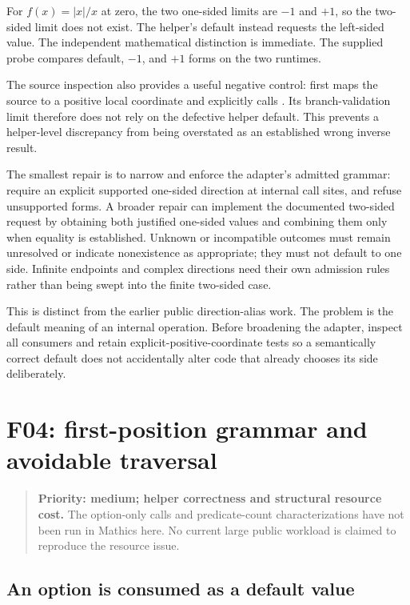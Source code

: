 \documentclass[11pt,letterpaper]{article}
\newcommand{\code}[1]{\texttt{\detokenize{#1}}}
\newenvironment{assessment}{\begin{quote}\small\color{ink}}{\end{quote}}
\begin{document}
For $f(x)=|x|/x$ at zero, the two one-sided limits are $-1$ and $+1$, so the two-sided limit does not exist. The helper's default instead requests the left-sided value. The independent mathematical distinction is immediate. The supplied probe compares default, $-1$, and $+1$ forms on the two runtimes.

The source inspection also provides a useful negative control: \code{inverseBranchValidate} first maps the source to a positive local coordinate and explicitly calls \code{Limit[...,u->0,Direction->-1,...]}. Its branch-validation limit therefore does not rely on the defective helper default.\cite{inverse-branches} This prevents a helper-level discrepancy from being overstated as an established wrong inverse result.

The smallest repair is to narrow and enforce the adapter's admitted grammar: require an explicit supported one-sided direction at internal call sites, and refuse unsupported forms. A broader repair can implement the documented two-sided request by obtaining both justified one-sided values and combining them only when equality is established. Unknown or incompatible outcomes must remain unresolved or indicate nonexistence as appropriate; they must not default to one side. Infinite endpoints and complex directions need their own admission rules rather than being swept into the finite two-sided case.

This is distinct from the earlier public direction-alias work. The problem is the default meaning of an internal operation. Before broadening the adapter, inspect all consumers and retain explicit-positive-coordinate tests so a semantically correct default does not accidentally alter code that already chooses its side deliberately.

\section{F04: first-position grammar and avoidable traversal}\label{sec:f04}
\begin{assessment}
\textbf{Priority: medium; helper correctness and structural resource cost.} The option-only calls and predicate-count characterizations have not been run in Mathics here. No current large public workload is claimed to reproduce the resource issue.
\end{assessment}

\subsection{An option is consumed as a default value}
\end{document}
